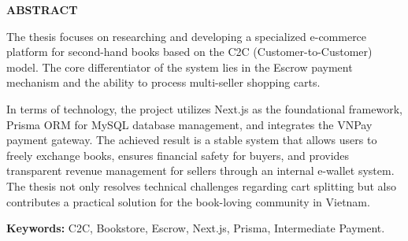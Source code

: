 \documentclass[../main.tex]{subfiles}
\begin{document}
\begin{center}
    \textbf{\huge ABSTRACT}
\end{center}
\vspace{0.5cm}

The thesis focuses on researching and developing a specialized e-commerce platform for second-hand books based on the C2C (Customer-to-Customer) model. The core differentiator of the system lies in the Escrow payment mechanism and the ability to process multi-seller shopping carts.

In terms of technology, the project utilizes Next.js as the foundational framework, Prisma ORM for MySQL database management, and integrates the VNPay payment gateway. The achieved result is a stable system that allows users to freely exchange books, ensures financial safety for buyers, and provides transparent revenue management for sellers through an internal e-wallet system. The thesis not only resolves technical challenges regarding cart splitting but also contributes a practical solution for the book-loving community in Vietnam.

\textbf{Keywords:} C2C, Bookstore, Escrow, Next.js, Prisma, Intermediate Payment.
\end{document}
